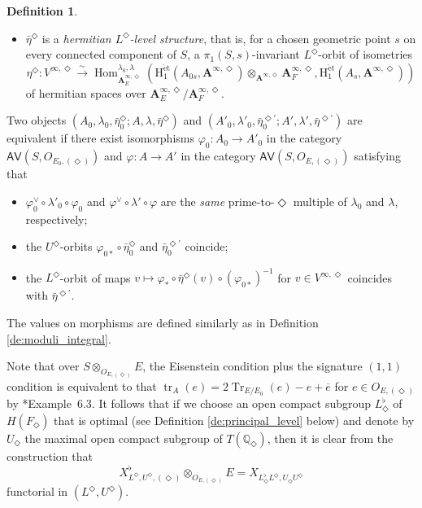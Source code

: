 \documentclass[12pt]{amsart}
\numberwithin{equation}{section}
\theoremstyle{plain}
\theoremstyle{definition}
\newtheorem{definition}[proposition]{Definition}
\theoremstyle{remark}
\renewcommand{\b}[1]{\mathbf{#1}}
\renewcommand{\d}[1]{\mathbb{#1}}
\renewcommand{\r}[1]{\mathrm{#1}}
\renewcommand{\sf}[1]{\mathsf{#1}}
\renewcommand{\(}{\left(}
\renewcommand{\)}{\right)}
\newcommand{\ol}[1]{\overline{#1}{}}
\newcommand{\bA}{\b A}
\newcommand{\dQ}{\d Q}
\newcommand{\rH}{\r H}
\newcommand{\et}{{\acute{\r{e}}\r{t}}}
\newcommand{\AV}{\sf{AV}}
\DeclareMathOperator{\Hom}{Hom}
\DeclareMathOperator{\tr}{tr}
\DeclareMathOperator{\Tr}{Tr}
\begin{document}
\begin{definition}
\begin{itemize}
  \item $\bar\eta^\Diamond$ is a \emph{hermitian $L^\Diamond$-level structure}, that is, for a chosen geometric point $s$ on every connected component of $S$, a $\pi_1(S,s)$-invariant $L^\Diamond$-orbit of isometries
      \[
      \eta^\Diamond\colon V^{\infty,\Diamond}\xrightarrow\sim\Hom_{\bA_E^{\infty,\Diamond}}^{\lambda_0,\lambda}
      \(\rH_1^{\et}(A_{0s},\bA^{\infty,\Diamond})\otimes_{\bA^{\infty,\Diamond}}\bA_F^{\infty,\Diamond},
      \rH_1^{\et}(A_s,\bA^{\infty,\Diamond})\)
      \]
      of hermitian spaces over $\bA_E^{\infty,\Diamond}/\bA_F^{\infty,\Diamond}$.
\end{itemize}
Two objects $(A_0,\lambda_0,\bar\eta_0^\Diamond;A,\lambda,\bar\eta^\Diamond)$ and $(A'_0,\lambda'_0,\bar\eta_0^{\Diamond\prime};A',\lambda',\bar\eta^{\Diamond\prime})$ are equivalent if there exist isomorphisms $\varphi_0\colon A_0\to A'_0$ in the category $\AV(S,O_{E_0,(\Diamond)})$ and $\varphi\colon A\to A'$ in the category $\AV(S,O_{E,(\Diamond)})$ satisfying that
\begin{itemize}
  \item $\varphi_0^\vee\circ\lambda'_0\circ\varphi_0$ and $\varphi^\vee\circ\lambda'\circ\varphi$ are the \emph{same} prime-to-$\Diamond$ multiple of $\lambda_0$ and $\lambda$, respectively;

  \item the $U^\Diamond$-orbits $\varphi_{0*}\circ\bar\eta_0^\Diamond$ and $\bar\eta_0^{\Diamond\prime}$ coincide;

  \item the $L^\Diamond$-orbit of maps $v\mapsto\varphi_*\circ\bar\eta^\Diamond(v)\circ(\varphi_{0*})^{-1}$ for $v\in V^{\infty,\Diamond}$ coincides with $\bar\eta^{\Diamond\prime}$.
\end{itemize}
The values on morphisms are defined similarly as in Definition \ref{de:moduli_integral}.
\end{definition}




Note that over $S\otimes_{O_{E,(\Diamond)}}E$, the Eisenstein condition plus the signature $(1,1)$ condition is equivalent to that $\tr_A(e)=2\Tr_{E/E_0}(e)-e+\ol{e}$ for $e\in O_{E,(\Diamond)}$ by \cite{LMZ}*{Example~6.3}. It follows that if we choose an open compact subgroup $L^\flat_\Diamond$ of $H(F_\Diamond)$ that is optimal (see Definition \ref{de:principal_level} below) and denote by $U_\Diamond$ the maximal open compact subgroup of $T(\dQ_\Diamond)$, then it is clear from the construction that
\[
X^\flat_{L^\Diamond,U^\Diamond,(\Diamond)}\otimes_{O_{E,(\Diamond)}}E=X_{L^\flat_\Diamond L^\Diamond,U_\Diamond U^\Diamond}
\]
functorial in $(L^\Diamond,U^\Diamond)$.
\end{document}

